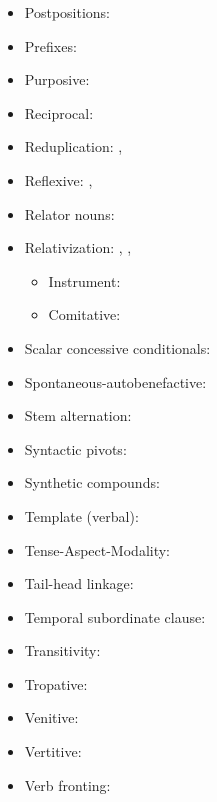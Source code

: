 \documentclass[oldfontcommands,oneside,a4paper,11pt]{article}
\begin{document}
\begin{itemize}
\item Postpositions:  \citet[272-4]{jacques14linking}
\item Prefixes: \citet[196-199]{jacques13harmonization}
\item Purposive:  \citet[306-8]{jacques14linking}
\item Reciprocal: \citet[212]{jacques12demotion}
\item Reduplication: \citet{jacques04these}, \citet{jacques07redupl}
\item Reflexive: \citet{jacques10refl}, \citet[85]{jacques12agreement}
\item Relator nouns:  \citet[274-6]{jacques14linking}
\item Relativization: \citet{jacques08}, \citet{jacques16relatives},\citet{jacques16sketch}
\begin{itemize}
\item Instrument: \citet{jacques16comparative}
\item Comitative: \citet[272-4]{jacques14linking}
\end{itemize}
\item Scalar concessive conditionals: \citet[300]{jacques14linking}
\item Spontaneous-autobenefactive: \citet{jacques15spontaneous}
\item Stem alternation:  \citet[267]{jacques14linking}
\item Syntactic pivots: \citet{jacques16relatives}
\item Synthetic compounds: \citet[1220-3]{jacques12incorp}
\item Template (verbal): \citet[196-199]{jacques13harmonization}
\item Tense-Aspect-Modality:  \citet[265-9]{jacques14linking}
\item Tail-head linkage:  \citet[279-280]{jacques14linking}
\item Temporal subordinate clause:  \citet[281-295]{jacques14linking}
\item Transitivity: \citet[9-10]{jacques14antipassive}
\item Tropative: \citet{jacques13tropative}
\item Venitive: \citet[200-6]{jacques13harmonization}
\item Vertitive:  \citet{jacques15spontaneous}
\item Verb fronting:  \citet[280]{jacques14linking}
\end{itemize}



\end{document}
